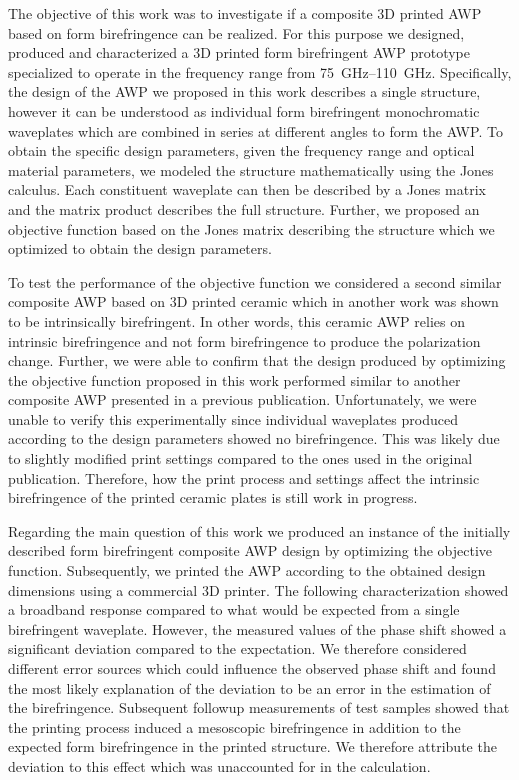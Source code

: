 \label{ch:conclusion}

The objective of this work was to investigate if a composite 3D printed AWP based on form birefringence can be realized. For this purpose we designed, produced and characterized a 3D printed form birefringent AWP prototype specialized to operate in the frequency range from \SIrange{75}{110}{\giga \hertz}. Specifically, the design of the AWP we proposed in this work describes a single structure, however it can be understood as individual form birefringent monochromatic waveplates which are combined in series at different angles to form the AWP. To obtain the specific design parameters, given the frequency range and optical material parameters, we modeled the structure mathematically using the Jones calculus. Each constituent waveplate can then be described by a Jones matrix and the matrix product describes the full structure. Further, we proposed an objective function based on the Jones matrix describing the structure which we optimized to obtain the design parameters. 

To test the performance of the objective function we considered a second similar composite AWP based on 3D printed  ceramic which in another work was shown to be intrinsically birefringent. In other words, this ceramic AWP relies on intrinsic birefringence and not form birefringence to produce the polarization change. Further, we were able to confirm that the design produced by optimizing the objective function proposed in this work performed similar to another composite AWP presented in a previous publication. Unfortunately, we were unable to verify this experimentally since individual waveplates produced according to the design parameters showed no birefringence. This was likely due to slightly modified print settings compared to the ones used in the original publication. Therefore, how the print process and settings affect the intrinsic birefringence of the printed ceramic plates is still work in progress.

Regarding the main question of this work we produced an instance of the initially described form birefringent composite AWP design by optimizing the objective function. Subsequently, we printed the AWP according to the obtained design dimensions using a commercial 3D printer. The following characterization showed a broadband response compared to what would be expected from a single birefringent waveplate. However, the measured values of the phase shift showed a significant deviation compared to the expectation. We therefore considered different error sources which could influence the observed phase shift and found the most likely explanation of the deviation to be an error in the estimation of the birefringence. Subsequent followup measurements of test samples showed that the printing process induced a mesoscopic birefringence in addition to the expected form birefringence in the printed structure. We therefore attribute the deviation to this effect which was unaccounted for in the calculation. 

